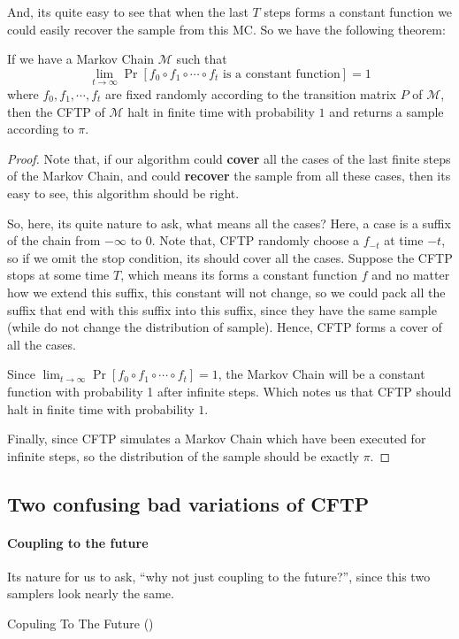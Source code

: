 And, its quite easy to see that when the last $T$ steps forms a constant function we could easily recover the sample from this MC. So we have the following theorem:
\begin{theorem}
  If we have a Markov Chain $\mathcal{M}$ such that
  \[\lim_{t\to\infty} \Pr [f_0 \circ f_1 \circ \cdots \circ f_t \mbox{ is a constant function}] = 1\]
  where $f_0, f_1, \cdots, f_t$ are fixed randomly according to the transition matrix $P$ of $\mathcal{M}$,
  then the CFTP of $\mathcal{M}$ halt in finite time with probability $1$ and returns a sample according to $\pi$.
\end{theorem}
\begin{proof}
  Note that, if our algorithm could \textbf{cover} all the cases of the last finite steps of the Markov Chain, and could \textbf{recover} the sample from all these cases, then its easy to see, this algorithm should be right.

  So, here, its quite nature to ask, what means all the cases?
  Here, a case is a suffix of the chain from $-\infty$ to $0$.
  Note that, CFTP randomly choose a $f_{-t}$ at time $-t$, so if we omit the stop condition, its should cover all the cases.
  Suppose the CFTP stops at some time $T$, which means its forms a constant function $f$ and no matter how we extend this suffix, this constant will not change, so we could pack all the suffix that end with this suffix into this suffix, since they have the same sample (while do not change the distribution of sample).
  Hence, CFTP forms a cover of all the cases.

  Since $\lim_{t\to\infty}\Pr[f_0\circ f_1\circ \cdots\circ f_t] = 1$, the Markov Chain will be a constant function with probability 1 after infinite steps. Which notes us that CFTP should halt in finite time with probability $1$.
  
  Finally, since CFTP simulates a Markov Chain which have been executed for infinite steps, so the distribution of the sample should be exactly $\pi$.
\end{proof}

\subsection{Two confusing bad variations of CFTP}
\paragraph{Coupling to the future}
Its nature for us to ask, ``why not just coupling to the future?'', since this two samplers look nearly the same.
\begin{algorithm}
  Copuling To The Future () 
\end{algorithm}

